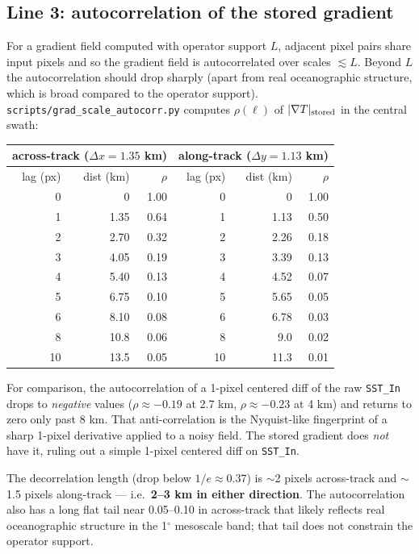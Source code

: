 \documentclass[11pt]{article}
\begin{document}
\subsection{Line 3: autocorrelation of the stored gradient}\label{sec:line3}

For a gradient field computed with operator support $L$, adjacent
pixel pairs share input pixels and so the gradient field is
autocorrelated over scales $\lesssim L$. Beyond $L$ the
autocorrelation should drop sharply (apart from real
oceanographic structure, which is broad compared to the operator
support). \texttt{scripts/grad\_scale\_autocorr.py} computes
$\rho(\ell)$ of $|\nabla T|_{\rm stored}$ in the central swath:

\begin{center}
\begin{tabular}{@{}rrr|rrr@{}}
\toprule
\multicolumn{3}{c|}{across-track ($\Delta x = 1.35$ km)} &
\multicolumn{3}{c}{along-track ($\Delta y = 1.13$ km)} \\
\midrule
lag (px) & dist (km) & $\rho$ & lag (px) & dist (km) & $\rho$ \\
\midrule
0 & 0   & 1.00 & 0 & 0   & 1.00 \\
1 & 1.35 & 0.64 & 1 & 1.13 & 0.50 \\
2 & 2.70 & 0.32 & 2 & 2.26 & 0.18 \\
3 & 4.05 & 0.19 & 3 & 3.39 & 0.13 \\
4 & 5.40 & 0.13 & 4 & 4.52 & 0.07 \\
5 & 6.75 & 0.10 & 5 & 5.65 & 0.05 \\
6 & 8.10 & 0.08 & 6 & 6.78 & 0.03 \\
8 & 10.8 & 0.06 & 8 & 9.0 & 0.02 \\
10 & 13.5 & 0.05 & 10 & 11.3 & 0.01 \\
\bottomrule
\end{tabular}
\end{center}

For comparison, the autocorrelation of a 1-pixel centered diff of
the raw \texttt{SST\_In} drops to \emph{negative} values
($\rho \approx -0.19$ at 2.7 km, $\rho \approx -0.23$ at 4 km)
and returns to zero only past 8 km. That anti-correlation is the
Nyquist-like fingerprint of a sharp 1-pixel derivative applied to
a noisy field. The stored gradient does \emph{not} have it, ruling
out a simple 1-pixel centered diff on \texttt{SST\_In}.

The decorrelation length (drop below $1/e \approx 0.37$) is
$\sim$2 pixels across-track and $\sim$1.5 pixels along-track ---
i.e.\ \textbf{2--3 km in either direction}. The autocorrelation
also has a long flat tail near 0.05--0.10 in across-track that
likely reflects real oceanographic structure in the 1$^\circ$
mesoscale band; that tail does not constrain the operator support.
\end{document}
